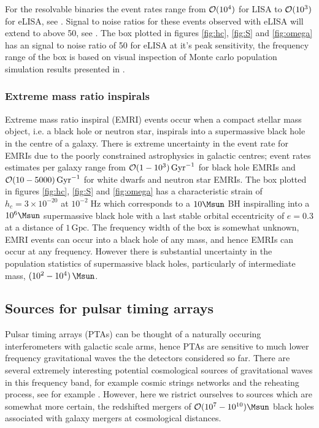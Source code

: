 For the resolvable binaries the event rates range from ${\cal{O}}(10^{4})$ for LISA to ${\cal{O}}(10^{3})$ for eLISA, see \cite{JohnsLivingReview}. Signal to noise ratios for these events observed with eLISA will extend to above 50, see \cite{DoingScienceWitheLISA}. The box plotted in figures \ref{fig:hc}, \ref{fig:S} and \ref{fig:omega} has an signal to noise ratio of 50 for eLISA at it's peak sensitivity, the frequency range of the box is based on visual inspection of Monte carlo population simulation results presented in \cite{DoingScienceWitheLISA}.

\subsubsection{Extreme mass ratio inspirals}
Extreme mass ratio inspiral (EMRI) events occur when a compact stellar mass object, i.e. a black hole or neutron star, inspirals into a supermassive black hole in the centre of a galaxy. There is extreme uncertainty in the event rate for EMRIs due to the poorly constrained astrophysics in galactic centres; event rates estimates per galaxy range from ${\cal{O}}(1-10^{3})\,\textrm{Gyr}^{-1}$ for black hole EMRIs and ${\cal{O}}(10-5000)\,\textrm{Gyr}^{-1}$ for white dwarfs and neutron star EMRIs. The box plotted in figures \ref{fig:hc}, \ref{fig:S} and \ref{fig:omega} has a characteristic strain of $h_{c}=3\times 10^{-20}$ at $10^{-2}\;\textrm{Hz}$ which corresponds to a $10\Msun$ BH inspiralling into a $10^{6}\Msun$ supermassive black hole with a last stable orbital eccentricity of $e=0.3$ at a distance of $1\,\textrm{Gpc}$. The frequency width of the box is somewhat unknown, EMRI events can occur into a black hole of any mass, and hence EMRIs can occur at any frequency. However there is substantial uncertainty in the population statistics of supermassive black holes, particularly of intermediate mass, $(10^{2}-10^{4})\,\Msun$.












\subsection{Sources for pulsar timing arrays}
Pulsar timing arrays (PTAs) can be thought of a naturally occuring interferometers with galactic scale arms, hence PTAs are sensitive to much lower frequency gravitational waves the the detectors considered so far. There are several extremely interesting potential cosmological sources of gravitational waves in this frequency band, for example cosmic strings networks and the reheating process, see for example \cite{Haasteren}. However, here we ristrict ourselves to sources which are somewhat more certain, the redshifted mergers of ${\cal{O}}(10^{7}-10^{10})\Msun$ black holes associated with galaxy mergers at cosmological distances.

